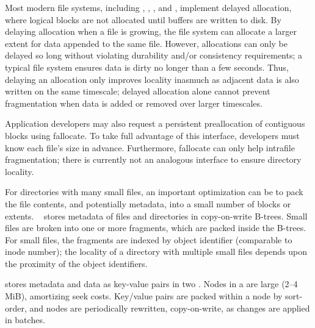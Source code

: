  Most modern file systems, including \ext, \xfs,
\btrfs, and \zfs, implement delayed allocation, where 
logical blocks are not allocated until buffers are written to disk. 
By delaying allocation when a file is growing,
the file system can allocate a larger extent for data appended to the same file.
However, allocations can only be delayed so long without
violating durability and/or consistency requirements; a typical
file system ensures data is dirty no longer than a few seconds.
Thus, delaying an allocation only improves locality inasmuch
as adjacent data is also written on the same timescale;
delayed allocation alone cannot prevent fragmentation when 
data is added or removed  over larger timescales.

Application developers may also request a persistent preallocation
of contiguous blocks using fallocate.
To take full advantage of this interface, 
developers must know each file's size in advance. %
Furthermore, fallocate can only help intrafile fragmentation; there is currently 
not an
analogous interface to ensure directory locality.

For directories with many small files, an important optimization 
can be to pack the file contents, and potentially metadata,
into a small number of blocks or extents.
\btrfs~\cite{RodehBaMa13} stores metadata of files and directories in
copy-on-write B-trees. Small files are broken into 
one or more fragments, which are packed inside the B-trees.
For small files, the fragments are indexed by object identifier (comparable to inode number);
the locality of a directory with multiple small files
depends upon the proximity of the object identifiers.

\betrfs stores metadata and data as key-value
pairs in two \bets.  Nodes in a \bet are large (2--4 MiB),
amortizing seek costs.  Key/value pairs are packed
within a node by sort-order, and nodes are periodically rewritten,
copy-on-write, as changes are applied in batches.


